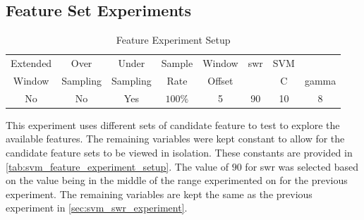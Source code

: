 \subsection{Feature Set Experiments}
\label{sec:svm_feature_set_experiments}


\begin{table}[h]
\begin{center}

    \begin{tabular}{|c|c|c|c|c|c|cc|}
        \hline
        Extended & Over & Under & Sample & Window & \gls{swr} & SVM & \\
        Window & Sampling & Sampling & Rate & Offset &  & C & gamma \\ \hline
        No & No & Yes & $100\%$ & 5 & 90 & 10 & 8 \\ \hline
    \end{tabular}
    \caption{Feature Experiment Setup}
    \label{tab:svm_feature_experiment_setup}
\end{center}

\end{table}



This experiment uses different sets of candidate feature to test to explore the available features. The remaining variables were kept constant to allow for the candidate feature sets to be viewed in isolation. These constants are provided in \autoref{tab:svm_feature_experiment_setup}. The value of $90$ for \gls{swr} was selected based on the value being in the middle of the range experimented on for the previous experiment. The remaining variables are kept the same as the previous experiment in \autoref{sec:svm_swr_experiment}. 

